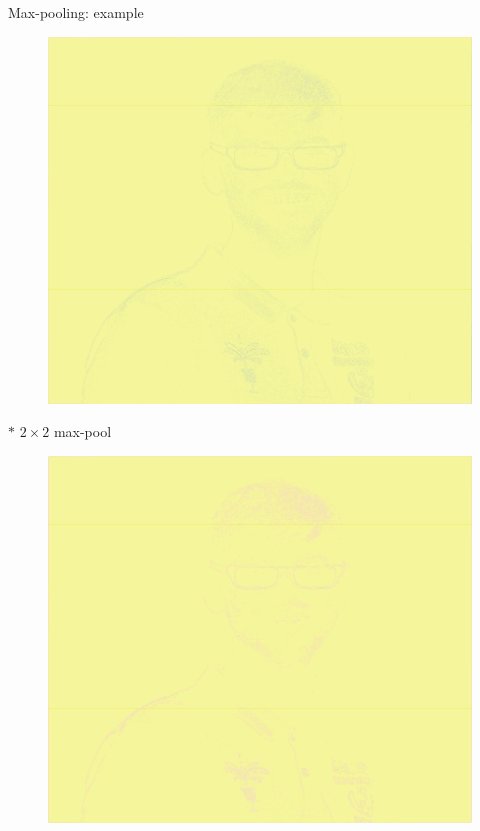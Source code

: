 \documentclass{beamer}
\begin{document}
\begin{frame}{Max-pooling: example}

\begin{minipage}{0.32\linewidth}
\begin{figure}
\includegraphics[width=\linewidth]{Images/conv16.png}
\end{figure}

\end{minipage}
\begin{minipage}{0.32\linewidth}
$*$ $2 \times 2$ max-pool
\end{minipage}
\begin{minipage}{0.32\linewidth}
\begin{figure}
\includegraphics[width=\linewidth]{Images/conv17.png}
\end{figure}
\end{minipage}
\end{frame}
\end{document}
